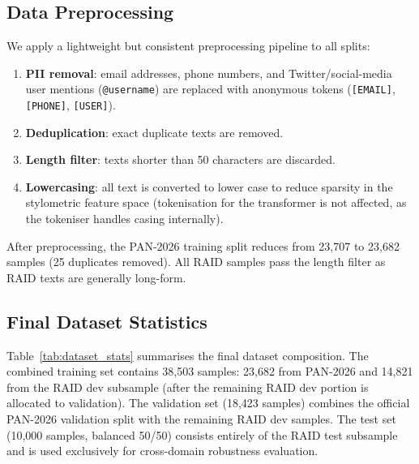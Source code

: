 \subsection{Data Preprocessing}

We apply a lightweight but consistent preprocessing pipeline to all splits:

\begin{enumerate}
  \item \textbf{PII removal}: email addresses, phone numbers, and Twitter/social-media
        user mentions (\texttt{@username}) are replaced with anonymous tokens
        (\texttt{[EMAIL]}, \texttt{[PHONE]}, \texttt{[USER]}).
  \item \textbf{Deduplication}: exact duplicate texts are removed.
  \item \textbf{Length filter}: texts shorter than 50 characters are discarded.
  \item \textbf{Lowercasing}: all text is converted to lower case to reduce sparsity
        in the stylometric feature space (tokenisation for the transformer is not
        affected, as the tokeniser handles casing internally).
\end{enumerate}

After preprocessing, the PAN-2026 training split reduces from 23,707 to 23,682 samples
(25 duplicates removed). All RAID samples pass the length filter as RAID texts are
generally long-form.

\subsection{Final Dataset Statistics}

Table~\ref{tab:dataset_stats} summarises the final dataset composition. The combined
training set contains 38,503 samples: 23,682 from PAN-2026 and 14,821 from the RAID dev
subsample (after the remaining RAID dev portion is allocated to validation). The validation
set (18,423 samples) combines the official PAN-2026 validation split with the remaining
RAID dev samples. The test set (10,000 samples, balanced 50/50) consists entirely of
the RAID test subsample and is used exclusively for cross-domain robustness evaluation.

